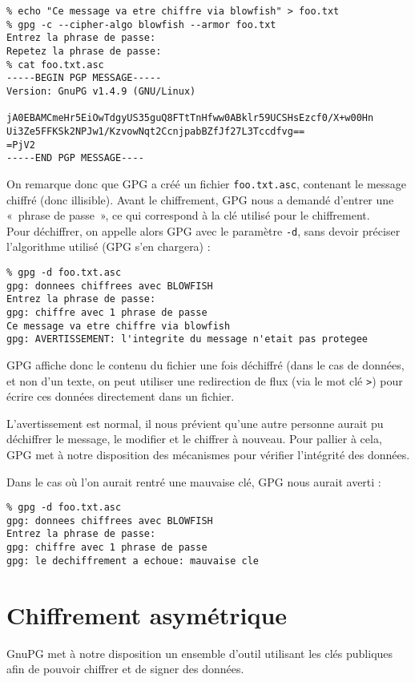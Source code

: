 \begin{lstlisting}
% echo "Ce message va etre chiffre via blowfish" > foo.txt
% gpg -c --cipher-algo blowfish --armor foo.txt
Entrez la phrase de passe: 
Repetez la phrase de passe: 
% cat foo.txt.asc
-----BEGIN PGP MESSAGE-----
Version: GnuPG v1.4.9 (GNU/Linux)

jA0EBAMCmeHr5EiOwTdgyUS35guQ8FTtTnHfww0ABklr59UCSHsEzcf0/X+w00Hn
Ui3Ze5FFKSk2NPJw1/KzvowNqt2CcnjpabBZfJf27L3Tccdfvg==
=PjV2
-----END PGP MESSAGE----
\end{lstlisting}

On remarque donc que GPG a créé un fichier \texttt{foo.txt.asc},
contenant le message chiffré (donc illisible). 
Avant le chiffrement, GPG nous a
demandé d'entrer une «~phrase de passe~», ce qui correspond à la
clé utilisé pour le chiffrement.
\\

Pour déchiffrer, on appelle alors GPG avec le paramètre
\texttt{-d}, sans devoir préciser l'algorithme utilisé (GPG s'en
chargera) : 

\begin{lstlisting}
% gpg -d foo.txt.asc 
gpg: donnees chiffrees avec BLOWFISH
Entrez la phrase de passe: 
gpg: chiffre avec 1 phrase de passe
Ce message va etre chiffre via blowfish
gpg: AVERTISSEMENT: l'integrite du message n'etait pas protegee
\end{lstlisting}

GPG affiche donc le contenu du fichier une fois déchiffré (dans le
cas de données, et non d'un texte, on peut utiliser une
redirection de flux (via le mot clé \texttt{>}) pour écrire ces 
données directement dans un fichier.

L'avertissement est normal, il nous prévient qu'une autre personne
aurait pu déchiffrer le message, le modifier et le chiffrer à
nouveau. Pour pallier à cela, GPG met à notre disposition des
mécanismes pour vérifier l'intégrité des données. 

Dans le cas où l'on aurait rentré une mauvaise clé, GPG nous
aurait averti : 
\begin{lstlisting}
% gpg -d foo.txt.asc
gpg: donnees chiffrees avec BLOWFISH
Entrez la phrase de passe:
gpg: chiffre avec 1 phrase de passe
gpg: le dechiffrement a echoue: mauvaise cle
\end{lstlisting}

\section{Chiffrement asymétrique}
GnuPG met à notre disposition un ensemble d'outil utilisant les
clés publiques afin de pouvoir chiffrer et de signer des données.

